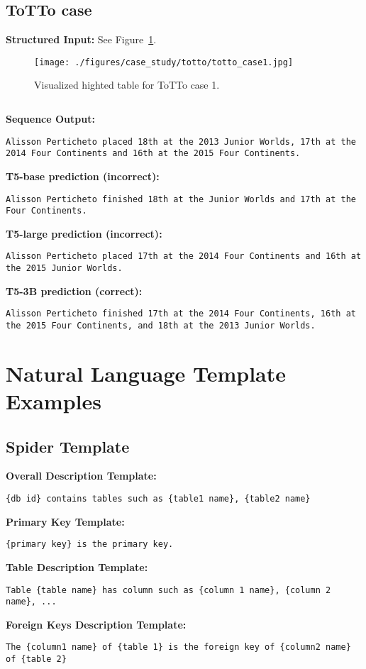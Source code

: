 \documentclass[11pt]{article}
\begin{document}
\subsection{ToTTo case}
\label{app:totto_case}
\textbf{Structured Input:} 
See Figure~\ref{fig:totto_case1}.
\begin{figure}[!t]
    \centering
    \texttt{[image: ./figures/case\_study/totto/totto\_case1.jpg]}
    \caption{Visualized highted table for ToTTo case 1. }
\label{fig:totto_case1}
\end{figure}
\begin{lstlisting}
\end{lstlisting}
\textbf{Sequence Output:} 
\begin{lstlisting}
Alisson Perticheto placed 18th at the 2013 Junior Worlds, 17th at the 2014 Four Continents and 16th at the 2015 Four Continents.
\end{lstlisting}
\textbf{T5-base prediction (incorrect):} 
\begin{lstlisting}
Alisson Perticheto finished 18th at the Junior Worlds and 17th at the Four Continents.
\end{lstlisting}
\textbf{T5-large prediction (incorrect):} 
\begin{lstlisting}
Alisson Perticheto placed 17th at the 2014 Four Continents and 16th at the 2015 Junior Worlds.
\end{lstlisting}
\textbf{T5-3B prediction (correct):} 
\begin{lstlisting}
Alisson Perticheto finished 17th at the 2014 Four Continents, 16th at the 2015 Four Continents, and 18th at the 2013 Junior Worlds.
\end{lstlisting}
 
\section{Natural Language Template Examples}
\label{app:examples_template}
\subsection{Spider Template}

\textbf{Overall Description Template:} 
\begin{lstlisting}
{db id} contains tables such as {table1 name}, {table2 name}
\end{lstlisting}
\textbf{Primary Key Template:}
\begin{lstlisting}
{primary key} is the primary key.
\end{lstlisting}
\textbf{Table Description Template:}
\begin{lstlisting}
Table {table name} has column such as {column 1 name}, {column 2 name}, ...
\end{lstlisting}
\textbf{Foreign Keys Description Template:}
\begin{lstlisting}
The {column1 name} of {table 1} is the foreign key of {column2 name} of {table 2}
\end{lstlisting}
\end{document}

